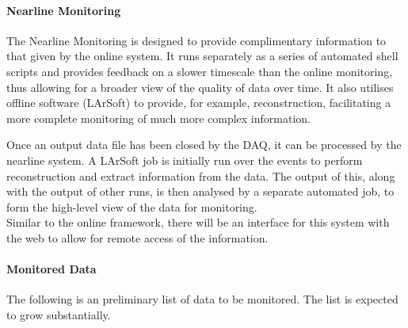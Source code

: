 \paragraph{Nearline Monitoring}

The Nearline Monitoring is designed to provide complimentary information to
that given by the online system. It runs separately as a series of automated
shell scripts and provides feedback on a slower timescale than the online
monitoring, thus allowing for a broader view of the quality of data over time.
It also utilises offline software (LArSoft) to provide, for example,
reconstruction, facilitating a more complete monitoring of much more complex
information.

Once an output data file has been closed by the DAQ, it can be processed by the
nearline system.  A LArSoft job is initially run over the events to perform
reconstruction and extract information from the data.  The output of this,
along with the output of other runs, is then analysed by a separate automated
job, to form the high-level view of the data for monitoring.\\
%
Similar to the online framework, there will be an interface for this system
with the web to allow for remote access of the information.

\paragraph{Monitored Data}

The following is an preliminary list of data to be 
monitored.  The list is expected to grow substantially.

